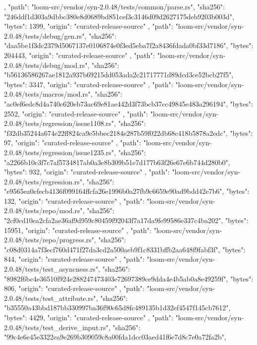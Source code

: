 {{    },
    {
      "path": "loom-src/vendor/syn-2.0.48/tests/common/parse.rs",
      "sha256": "246ddf1d303a9dbbc380e8d0689bd851cef3c3146d09d2627175deb9203b003d",
      "bytes": 1399,
      "origin": "curated-release-source"
    },
    {
      "path": "loom-src/vendor/syn-2.0.48/tests/debug/gen.rs",
      "sha256": "daa5be1f3dc2379d5067137e0106874e0f3ed5eba7f2a8436fdada0bf33d7186",
      "bytes": 204443,
      "origin": "curated-release-source"
    },
    {
      "path": "loom-src/vendor/syn-2.0.48/tests/debug/mod.rs",
      "sha256": "b56136586267ae1812a937b69215dd053ada2c21717771d89dcd3ce52bcb27f5",
      "bytes": 3347,
      "origin": "curated-release-source"
    },
    {
      "path": "loom-src/vendor/syn-2.0.48/tests/macros/mod.rs",
      "sha256": "ac0ef6edc8d4a740c620eb73ac69e81ae442d3f73bcb37cc49845e483a296194",
      "bytes": 2552,
      "origin": "curated-release-source"
    },
    {
      "path": "loom-src/vendor/syn-2.0.48/tests/regression/issue1108.rs",
      "sha256": "f32db35244a674e22ff824ca9e5bbec2184e287b59f022db68c418b5878a2edc",
      "bytes": 97,
      "origin": "curated-release-source"
    },
    {
      "path": "loom-src/vendor/syn-2.0.48/tests/regression/issue1235.rs",
      "sha256": "a2266b10c3f7c7af5734817ab0a3e8b309b51e7d177b63f26e67e6b744d280b0",
      "bytes": 932,
      "origin": "curated-release-source"
    },
    {
      "path": "loom-src/vendor/syn-2.0.48/tests/regression.rs",
      "sha256": "e9565ea0efecb4136f099164ffcfa26e1996b0a27fb9c6659e90ad9bdd42e7b6",
      "bytes": 132,
      "origin": "curated-release-source"
    },
    {
      "path": "loom-src/vendor/syn-2.0.48/tests/repo/mod.rs",
      "sha256": "2cf0cd10ea2cfa2ae36af9d959c80459f92043f7a17da9fe99586e337c4ba202",
      "bytes": 15951,
      "origin": "curated-release-source"
    },
    {
      "path": "loom-src/vendor/syn-2.0.48/tests/repo/progress.rs",
      "sha256": "c08d0314a7f3ecf760d471f27da3cd2a500aeb9f1c8331bffb2aa648f9fabf3f",
      "bytes": 844,
      "origin": "curated-release-source"
    },
    {
      "path": "loom-src/vendor/syn-2.0.48/tests/test_asyncness.rs",
      "sha256": "8982f6bc4e36510f924e288247473403e72697389ce9dda4e4b5ab0a8e49259f",
      "bytes": 806,
      "origin": "curated-release-source"
    },
    {
      "path": "loom-src/vendor/syn-2.0.48/tests/test_attribute.rs",
      "sha256": "b35550a43bbd187bb330997ba36f90c65d8fc489135b1d32ef4547f145cb7612",
      "bytes": 4429,
      "origin": "curated-release-source"
    },
    {
      "path": "loom-src/vendor/syn-2.0.48/tests/test_derive_input.rs",
      "sha256": "99c4e6e45e3322ea9e269b309059c8a00fda1dcc03aed41f6e7d8c7e0a72fa2b",
}}
